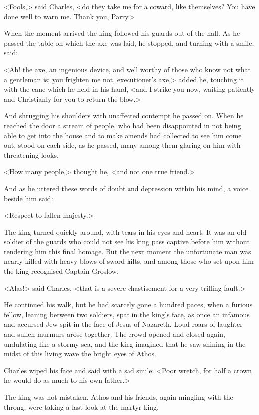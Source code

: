 <Fools,> said Charles, <do they take me for a coward, like themselves? You have done well to warn me. Thank you, Parry.>

When the moment arrived the king followed his guards out of the hall. As he passed the table on which the axe was laid, he stopped, and turning with a smile, said:

<Ah! the axe, an ingenious device, and well worthy of those who know not what a gentleman is; you frighten me not, executioner's axe,> added he, touching it with the cane which he held in his hand, <and I strike you now, waiting patiently and Christianly for you to return the blow.>

And shrugging his shoulders with unaffected contempt he passed on. When he reached the door a stream of people, who had been disappointed in not being able to get into the house and to make amends had collected to see him come out, stood on each side, as he passed, many among them glaring on him with threatening looks.

<How many people,> thought he, <and not one true friend.>

And as he uttered these words of doubt and depression within his mind, a voice beside him said:

<Respect to fallen majesty.>

The king turned quickly around, with tears in his eyes and heart. It was an old soldier of the guards who could not see his king pass captive before him without rendering him this final homage. But the next moment the unfortunate man was nearly killed with heavy blows of sword-hilts, and among those who set upon him the king recognised Captain Groslow.

<Alas!> said Charles, <that is a severe chastisement for a very trifling fault.>

He continued his walk, but he had scarcely gone a hundred paces, when a furious fellow, leaning between two soldiers, spat in the king's face, as once an infamous and accursed Jew spit in the face of Jesus of Nazareth. Loud roars of laughter and sullen murmurs arose together. The crowd opened and closed again, undulating like a stormy sea, and the king imagined that he saw shining in the midst of this living wave the bright eyes of Athos.

Charles wiped his face and said with a sad smile: <Poor wretch, for half a crown he would do as much to his own father.>

The king was not mistaken. Athos and his friends, again mingling with the throng, were taking a last look at the martyr king.

